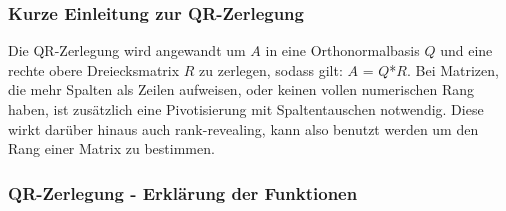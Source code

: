 \documentclass[a4paper,11pt]{article}
\theoremstyle{definition}
\begin{document}
\subsubsection{Kurze Einleitung zur QR-Zerlegung}

Die QR-Zerlegung wird angewandt um $A$ in eine Orthonormalbasis $Q$ und eine rechte
obere Dreiecksmatrix $R$ zu zerlegen, sodass gilt: $A$ = $Q$*$R$. Bei Matrizen, die
mehr Spalten als Zeilen aufweisen, oder keinen vollen numerischen Rang haben, ist
zusätzlich eine Pivotisierung mit Spaltentauschen notwendig. Diese wirkt darüber
hinaus auch rank-revealing, kann also benutzt werden um den Rang einer Matrix zu
bestimmen.

\subsubsection{QR-Zerlegung - Erklärung der Funktionen}
\end{document}
